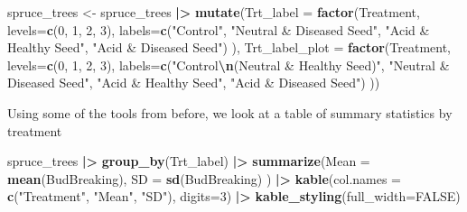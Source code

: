 \documentclass[
]{book}
\newenvironment{Shaded}{\begin{snugshade}}{\end{snugshade}}
\newcommand{\AttributeTok}[1]{\textcolor[rgb]{0.13,0.29,0.53}{#1}}
\newcommand{\ConstantTok}[1]{\textcolor[rgb]{0.56,0.35,0.01}{#1}}
\newcommand{\DecValTok}[1]{\textcolor[rgb]{0.00,0.00,0.81}{#1}}
\newcommand{\FunctionTok}[1]{\textcolor[rgb]{0.13,0.29,0.53}{\textbf{#1}}}
\newcommand{\NormalTok}[1]{#1}
\newcommand{\OtherTok}[1]{\textcolor[rgb]{0.56,0.35,0.01}{#1}}
\newcommand{\SpecialCharTok}[1]{\textcolor[rgb]{0.81,0.36,0.00}{\textbf{#1}}}
\newcommand{\StringTok}[1]{\textcolor[rgb]{0.31,0.60,0.02}{#1}}
\begin{document}
\begin{Shaded}
\begin{Highlighting}[]
\NormalTok{spruce\_trees }\OtherTok{\textless{}{-}}\NormalTok{ spruce\_trees }\SpecialCharTok{|\textgreater{}}
  \FunctionTok{mutate}\NormalTok{(}\AttributeTok{Trt\_label =} \FunctionTok{factor}\NormalTok{(Treatment, }
                            \AttributeTok{levels=}\FunctionTok{c}\NormalTok{(}\DecValTok{0}\NormalTok{, }\DecValTok{1}\NormalTok{, }\DecValTok{2}\NormalTok{, }\DecValTok{3}\NormalTok{),}
                            \AttributeTok{labels=}\FunctionTok{c}\NormalTok{(}\StringTok{"Control"}\NormalTok{,}
                                     \StringTok{"Neutral \& Diseased Seed"}\NormalTok{,}
                                     \StringTok{"Acid \& Healthy Seed"}\NormalTok{,}
                                     \StringTok{"Acid \& Diseased Seed"}\NormalTok{) ),}
         \AttributeTok{Trt\_label\_plot =} \FunctionTok{factor}\NormalTok{(Treatment, }
                            \AttributeTok{levels=}\FunctionTok{c}\NormalTok{(}\DecValTok{0}\NormalTok{, }\DecValTok{1}\NormalTok{, }\DecValTok{2}\NormalTok{, }\DecValTok{3}\NormalTok{),}
                            \AttributeTok{labels=}\FunctionTok{c}\NormalTok{(}\StringTok{"Control}\SpecialCharTok{\textbackslash{}n}\StringTok{(Neutral \& Healthy Seed)"}\NormalTok{,}
                                     \StringTok{"Neutral \& Diseased Seed"}\NormalTok{,}
                                     \StringTok{"Acid \& Healthy Seed"}\NormalTok{,}
                                     \StringTok{"Acid \& Diseased Seed"}\NormalTok{) ))}
\end{Highlighting}
\end{Shaded}

Using some of the tools from before, we look at a table of summary statistics by treatment

\begin{Shaded}
\begin{Highlighting}[]
\NormalTok{spruce\_trees }\SpecialCharTok{|\textgreater{}}
  \FunctionTok{group\_by}\NormalTok{(Trt\_label) }\SpecialCharTok{|\textgreater{}}
  \FunctionTok{summarize}\NormalTok{(}\AttributeTok{Mean =} \FunctionTok{mean}\NormalTok{(BudBreaking),}
            \AttributeTok{SD =} \FunctionTok{sd}\NormalTok{(BudBreaking) ) }\SpecialCharTok{|\textgreater{}}
  \FunctionTok{kable}\NormalTok{(}\AttributeTok{col.names =} \FunctionTok{c}\NormalTok{(}\StringTok{"Treatment"}\NormalTok{, }\StringTok{"Mean"}\NormalTok{, }\StringTok{"SD"}\NormalTok{),}
        \AttributeTok{digits=}\DecValTok{3}\NormalTok{) }\SpecialCharTok{|\textgreater{}}
  \FunctionTok{kable\_styling}\NormalTok{(}\AttributeTok{full\_width=}\ConstantTok{FALSE}\NormalTok{)}
\end{Highlighting}
\end{Shaded}
\end{document}
